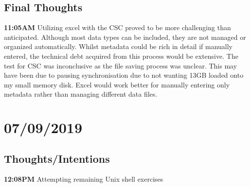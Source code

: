 \documentclass{article}
\begin{document}
\subsection{Final Thoughts}
\textbf{11:05AM} Utilizing excel with the CSC proved to be more challenging than anticipated. Although most data types can be included, they are not managed or organized automatically. Whilst metadata could be rich in detail if manually entered, the technical debt acquired from this process would be extensive. The test for CSC was inconclusive as the file saving process was unclear. This may have been due to pausing synchronisation due to not wanting 13GB loaded onto my small memory disk. Excel would work better for manually entering only metadata rather than managing different data files.

\section{07/09/2019}
\subsection{Thoughts/Intentions}
\textbf{12:08PM} Attempting remaining Unix shell exercises
\end{document}
